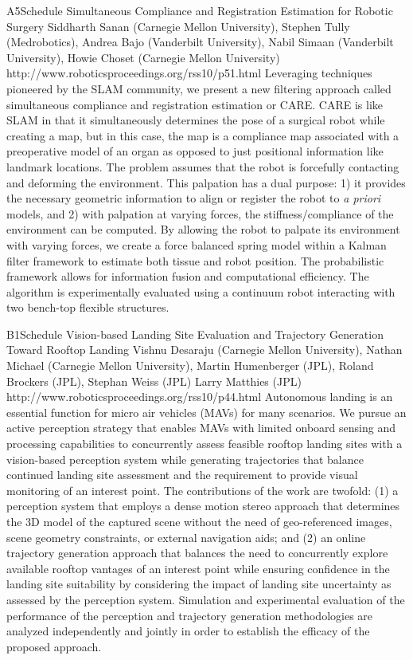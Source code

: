 \begin{spacing}{1.0}
\descriptionPaper
{A5}{Schedule}
{
Simultaneous Compliance and Registration Estimation for Robotic Surgery
}
{
Siddharth Sanan (Carnegie Mellon University), Stephen Tully (Medrobotics), Andrea Bajo (Vanderbilt University), Nabil Simaan (Vanderbilt University), Howie Choset (Carnegie Mellon University)
}
{
http://www.roboticsproceedings.org/rss10/p51.html
}
{
Leveraging techniques pioneered by the SLAM community, we present a new filtering approach called simultaneous compliance and registration estimation or CARE. CARE is like SLAM in that it simultaneously determines the pose of a surgical robot while creating a map, but in this case, the map is a compliance map associated with a preoperative model of an organ as opposed to just positional information like landmark locations. The problem assumes that the robot is forcefully contacting and deforming the environment. This palpation has a dual purpose: 1) it provides the necessary geometric information to align or register the robot to \textit{a priori} models, and 2) with palpation at varying forces, the stiffness/compliance of the environment can be computed. By allowing the robot to palpate its environment with varying forces, we create a force balanced spring model within a Kalman filter framework to estimate both tissue and robot position. The probabilistic framework allows for information fusion and computational efficiency. The algorithm is experimentally evaluated using a continuum robot interacting with two bench-top flexible structures.
}



\descriptionPaper
{B1}{Schedule}
{
Vision-based Landing Site Evaluation and Trajectory Generation Toward Rooftop Landing
}
{
Vishnu Desaraju (Carnegie Mellon University), Nathan Michael (Carnegie Mellon University), Martin Humenberger (JPL), Roland Brockers (JPL), Stephan Weiss (JPL) Larry Matthies (JPL)
}
{
http://www.roboticsproceedings.org/rss10/p44.html
}
{
Autonomous landing is an essential function for micro air vehicles (MAVs) for many scenarios. We pursue an active perception strategy that enables MAVs with limited onboard sensing and processing capabilities to concurrently assess feasible rooftop landing sites with a vision-based perception system while generating trajectories that balance continued landing site assessment and the requirement to provide visual monitoring of an interest point. The contributions of the work are twofold: (1) a perception system that employs a dense motion stereo approach that determines the 3D model of the captured scene without the need of geo-referenced images, scene geometry constraints, or external navigation aids; and (2) an online trajectory generation approach that balances the need to concurrently explore available rooftop vantages of an interest point while ensuring confidence in the landing site suitability by considering the impact of landing site uncertainty as assessed by the perception system. Simulation and experimental evaluation of the performance of the perception and trajectory generation methodologies are analyzed independently and jointly in order to establish the efficacy of the proposed approach.
}




\end{spacing}
